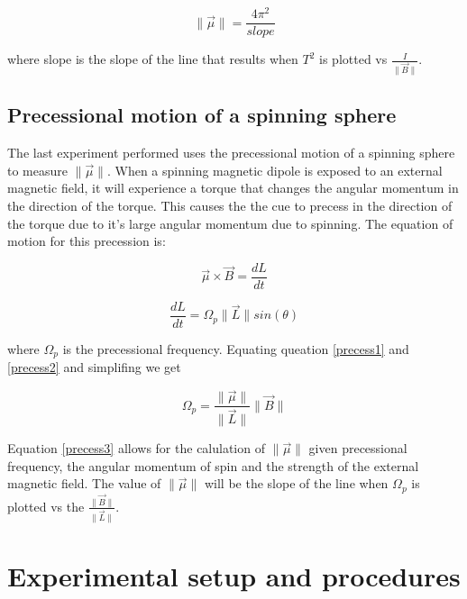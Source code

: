 \documentclass[twocolumn,secnumarabic,amssymb, nobibnotes, aps, pra]{revtex4}
\newcommand{\norm}[1]{\lVert#1\rVert}
\begin{document}
\begin{equation}
\norm{\vec{\mu}} = \frac{4\pi^2}{slope}
\label{eg:slope}   %
\end{equation} 

where slope is the slope of the line that results when $T^2$ is plotted vs  $\frac{I}{\norm{\vec{B}}}$.

\subsection{Precessional motion of a spinning sphere}

The last experiment performed uses the precessional motion of a spinning sphere to measure $\norm{\vec{\mu}}$.  When a spinning magnetic dipole is exposed to an external magnetic field, it will experience a torque that changes the angular momentum in the direction of the torque.  This causes the the cue to precess in the direction of the torque due to it's large angular momentum due to spinning.  The equation of motion for this precession is:

\begin{equation}
\vec{\mu} \times \vec{B} = \frac{dL}{dt}
\label{precess1}   %
\end{equation} 

\begin{equation}
\frac{dL}{dt} = \Omega_p\norm{\vec{L}}sin(\theta)
\label{precess2}   %
\end{equation} 


where $\Omega_p$ is the precessional frequency.  Equating queation \ref{precess1} and \ref{precess2} and simplifing we get

\begin{equation}
\Omega_p = \frac{\norm{\vec{\mu}}}{\norm{\vec{L}}} \norm{\vec{B}}
\label{precess3}   %
\end{equation} 

Equation \ref{precess3} allows for the calulation of $\norm{\vec{\mu}}$ given precessional frequency, the angular momentum of spin and the strength of the external magnetic field.  The value of $\norm{\vec{\mu}}$ will be the slope of the line when $\Omega_p$ is plotted vs the $\frac{\norm{\vec{B}}}{\norm{\vec{L}}}$.


\section{Experimental setup and procedures}
\end{document}
